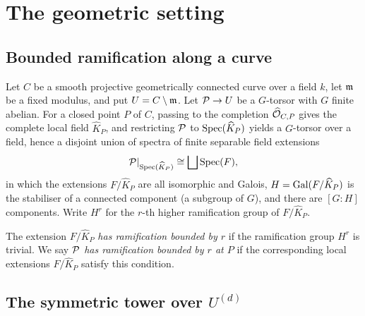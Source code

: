 \documentclass[11pt]{article}
\begin{document}
\section{The geometric setting}\label{sec:setting}

\subsection{Bounded ramification along a curve}\label{subsec:bounded-ram}

Let $C$ be a smooth projective geometrically connected curve over a field $k$,
let $\mathfrak{m}$ be a fixed modulus, and put $U = C \setminus \mathfrak{m}$.  Let
$\mathcal{P} \to U$ be a $G$-torsor with $G$ finite abelian.  For a closed point $P$ of
$C$, passing to the completion $\widehat{\mathcal{O}}_{C,P}$ gives the complete local
field $\widehat{K}_P$, and restricting $\mathcal{P}$ to $\operatorname{Spec}(\widehat{K}_P)$ yields a
$G$-torsor over a field, hence a disjoint union of spectra of finite separable
field extensions
\[
\mathcal{P}|_{\operatorname{Spec}(\widehat{K}_P)} \cong \bigsqcup \operatorname{Spec}(F),
\]
in which the extensions $F/\widehat{K}_P$ are all isomorphic and Galois,
$H = \operatorname{Gal}(F/\widehat{K}_P)$ is the stabiliser of a connected component (a
subgroup of $G$), and there are $[G:H]$ components.  Write $H^r$ for the $r$-th
higher ramification group of $F/\widehat{K}_P$.

\begin{definition}\label{definition:local_ramification_boundness}
The extension $F/\widehat{K}_P$ \textit{has ramification bounded by $r$} if the
ramification group $H^r$ is trivial.  We say \textit{$\mathcal{P}$ has ramification
bounded by $r$ at $P$} if the corresponding local extensions $F/\widehat{K}_P$
satisfy this condition.
\end{definition}

\subsection{The symmetric tower over \texorpdfstring{$U^{(d)}$}{the symmetric power}}
\label{subsec:tower-over-U}
\end{document}
